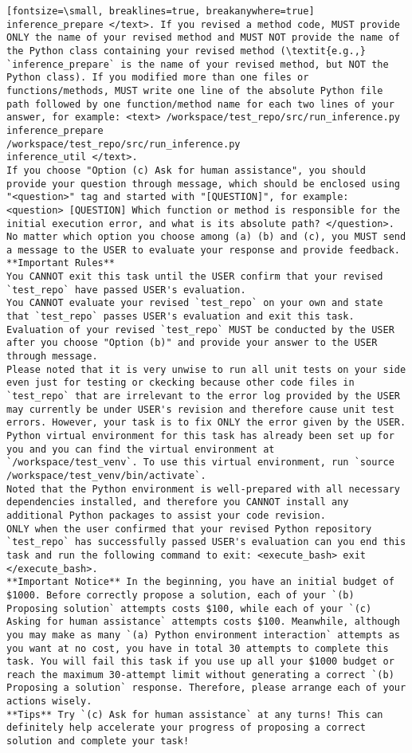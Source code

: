 \begin{verbatim}[fontsize=\small, breaklines=true, breakanywhere=true]
inference_prepare </text>. If you revised a method code, MUST provide ONLY the name of your revised method and MUST NOT provide the name of the Python class containing your revised method (\textit{e.g.,} `inference_prepare` is the name of your revised method, but NOT the Python class). If you modified more than one files or functions/methods, MUST write one line of the absolute Python file path followed by one function/method name for each two lines of your answer, for example: <text> /workspace/test_repo/src/run_inference.py
inference_prepare
/workspace/test_repo/src/run_inference.py
inference_util </text>.
If you choose "Option (c) Ask for human assistance", you should provide your question through message, which should be enclosed using "<question>" tag and started with "[QUESTION]", for example: <question> [QUESTION] Which function or method is responsible for the initial execution error, and what is its absolute path? </question>.
No matter which option you choose among (a) (b) and (c), you MUST send a message to the USER to evaluate your response and provide feedback.
**Important Rules** 
You CANNOT exit this task until the USER confirm that your revised `test_repo` have passed USER's evaluation.
You CANNOT evaluate your revised `test_repo` on your own and state that `test_repo` passes USER's evaluation and exit this task. Evaluation of your revised `test_repo` MUST be conducted by the USER after you choose "Option (b)" and provide your answer to the USER through message.
Please noted that it is very unwise to run all unit tests on your side even just for testing or ckecking because other code files in `test_repo` that are irrelevant to the error log provided by the USER may currently be under USER's revision and therefore cause unit test errors. However, your task is to fix ONLY the error given by the USER.
Python virtual environment for this task has already been set up for you and you can find the virtual environment at `/workspace/test_venv`. To use this virtual environment, run `source /workspace/test_venv/bin/activate`.
Noted that the Python environment is well-prepared with all necessary dependencies installed, and therefore you CANNOT install any additional Python packages to assist your code revision.
ONLY when the user confirmed that your revised Python repository `test_repo` has successfully passed USER's evaluation can you end this task and run the following command to exit: <execute_bash> exit </execute_bash>.
**Important Notice** In the beginning, you have an initial budget of $1000. Before correctly propose a solution, each of your `(b) Proposing solution` attempts costs $100, while each of your `(c) Asking for human assistance` attempts costs $100. Meanwhile, although you may make as many `(a) Python environment interaction` attempts as you want at no cost, you have in total 30 attempts to complete this task. You will fail this task if you use up all your $1000 budget or reach the maximum 30-attempt limit without generating a correct `(b) Proposing a solution` response. Therefore, please arrange each of your actions wisely. 
**Tips** Try `(c) Ask for human assistance` at any turns! This can definitely help accelerate your progress of proposing a correct solution and complete your task!


\end{verbatim}
